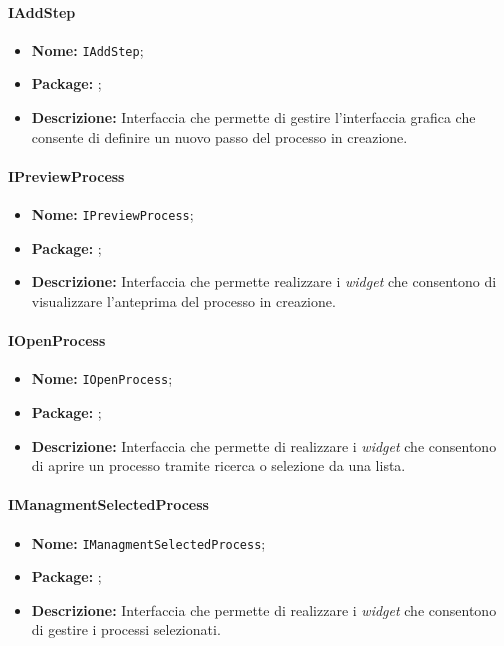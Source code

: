 \paragraph{IAddStep}
\begin{itemize}
\item \textbf{Nome:} \texttt{IAddStep};
\item \textbf{Package:} \texttt{\iViewAdmin{}};
\item \textbf{Descrizione:} Interfaccia che permette di gestire l'interfaccia grafica che consente di definire un nuovo passo del processo in creazione.
\end{itemize}

\paragraph{IPreviewProcess}
\begin{itemize}
\item \textbf{Nome:} \texttt{IPreviewProcess};
\item \textbf{Package:} \texttt{\iViewAdmin{}};
\item \textbf{Descrizione:} Interfaccia che permette realizzare i \textit{widget} che consentono di visualizzare l'anteprima del processo in creazione.
\end{itemize}

\paragraph{IOpenProcess}
\begin{itemize}
\item \textbf{Nome:} \texttt{IOpenProcess};
\item \textbf{Package:} \texttt{\iViewAdmin{}};
\item \textbf{Descrizione:} Interfaccia che permette di realizzare i \textit{widget} che consentono di aprire un processo tramite ricerca o selezione da una lista.
\end{itemize}

\paragraph{IManagmentSelectedProcess}
\begin{itemize}
\item \textbf{Nome:} \texttt{IManagmentSelectedProcess};
\item \textbf{Package:} \texttt{\iViewAdmin{}};
\item \textbf{Descrizione:} Interfaccia che permette di realizzare i \textit{widget} che consentono di gestire i processi selezionati.
\end{itemize}

